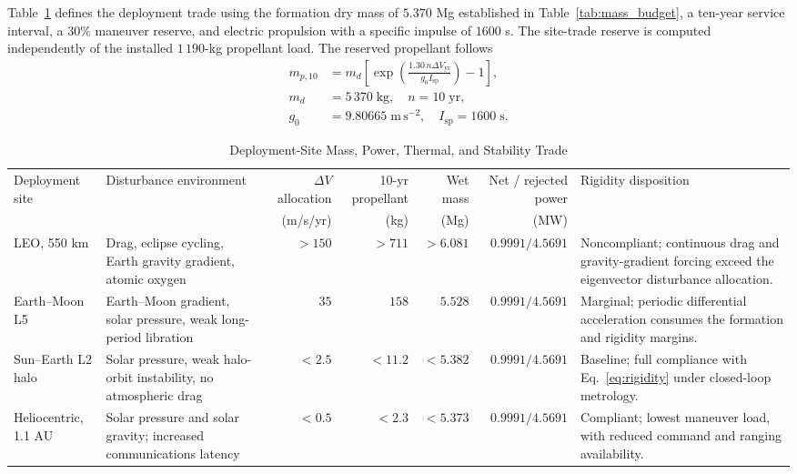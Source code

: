 \documentclass[10pt,twocolumn]{IEEEtran}
\begin{document}
Table~\ref{tab:site_trade} defines the deployment trade using the formation
dry mass of $5.370$ Mg established in Table~\ref{tab:mass_budget}, a ten-year
service interval, a $30\%$ maneuver reserve, and electric propulsion with a
specific impulse of $1600$ s. The site-trade reserve is computed independently
of the installed $1\,190$-kg propellant load. The reserved propellant follows
\begin{equation}
\begin{aligned}
m_{p,10} &= m_d\left[\exp\left(\frac{1.30\,n\Delta V_{\mathrm{yr}}}
{g_0 I_{\mathrm{sp}}}\right)-1\right], \\
m_d &= 5\,370\;\mathrm{kg},\quad n=10\;\mathrm{yr}, \\
g_0 &= 9.80665\;\mathrm{m\,s^{-2}},\quad I_{\mathrm{sp}}=1600\;\mathrm{s}.
\end{aligned}
\label{eq:propellant_reserve}
\end{equation}

\begin{table}[t]
\caption{Deployment-Site Mass, Power, Thermal, and Stability Trade}
\label{tab:site_trade}
\centering
\footnotesize
\begin{tabular}{@{}p{2.15cm}p{2.55cm}rrrrp{3.05cm}@{}}
\toprule
Deployment site & Disturbance environment & $\Delta V$ allocation & 10-yr propellant & Wet mass & Net / rejected power & Rigidity disposition \\
& & (m/s/yr) & (kg) & (Mg) & (MW) & \\
\midrule
LEO, 550 km & Drag, eclipse cycling, Earth gravity gradient, atomic oxygen & $>150$ & $>711$ & $>6.081$ & $0.9991/4.5691$ & Noncompliant; continuous drag and gravity-gradient forcing exceed the eigenvector disturbance allocation. \\
Earth--Moon L5 & Earth--Moon gradient, solar pressure, weak long-period libration & $35$ & $158$ & $5.528$ & $0.9991/4.5691$ & Marginal; periodic differential acceleration consumes the formation and rigidity margins. \\
Sun--Earth L2 halo & Solar pressure, weak halo-orbit instability, no atmospheric drag & $<2.5$ & $<11.2$ & $<5.382$ & $0.9991/4.5691$ & Baseline; full compliance with Eq.~\eqref{eq:rigidity} under closed-loop metrology. \\
Heliocentric, 1.1 AU & Solar pressure and solar gravity; increased communications latency & $<0.5$ & $<2.3$ & $<5.373$ & $0.9991/4.5691$ & Compliant; lowest maneuver load, with reduced command and ranging availability. \\
\bottomrule
\end{tabular}
\end{table}
\end{document}

